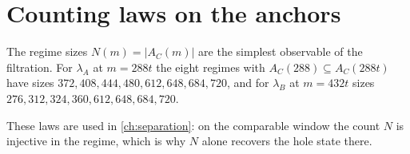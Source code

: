 \section{Counting laws on the anchors}
The regime sizes $N(m)=|A_C(m)|$ are the simplest observable of the filtration. For $\lambda_A$ at $m=288t$ the eight regimes with $A_C(288)\subseteq A_C(288t)$ have sizes $372,408,444,480,612,648,684,720$, and for $\lambda_B$ at $m=432t$ sizes $276,312,324,360,612,648,684,720$.
These laws are used in \cref{ch:separation}: on the comparable window the count $N$ is injective in the regime, which is why $N$ alone recovers the hole state there.
